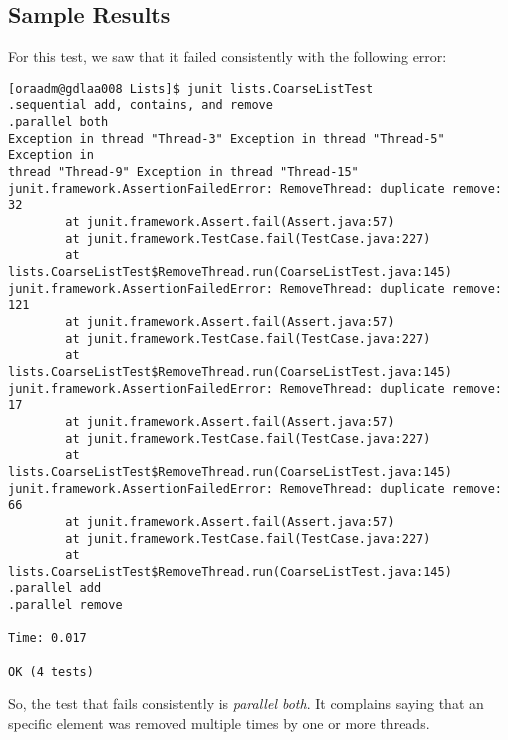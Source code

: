 \subsection{Sample Results}
\par
For this test, we saw that it failed consistently with the following error:
\begin{verbatim}
[oraadm@gdlaa008 Lists]$ junit lists.CoarseListTest
.sequential add, contains, and remove
.parallel both
Exception in thread "Thread-3" Exception in thread "Thread-5" Exception in
thread "Thread-9" Exception in thread "Thread-15"
junit.framework.AssertionFailedError: RemoveThread: duplicate remove: 32
        at junit.framework.Assert.fail(Assert.java:57)
        at junit.framework.TestCase.fail(TestCase.java:227)
        at lists.CoarseListTest$RemoveThread.run(CoarseListTest.java:145)
junit.framework.AssertionFailedError: RemoveThread: duplicate remove: 121
        at junit.framework.Assert.fail(Assert.java:57)
        at junit.framework.TestCase.fail(TestCase.java:227)
        at lists.CoarseListTest$RemoveThread.run(CoarseListTest.java:145)
junit.framework.AssertionFailedError: RemoveThread: duplicate remove: 17
        at junit.framework.Assert.fail(Assert.java:57)
        at junit.framework.TestCase.fail(TestCase.java:227)
        at lists.CoarseListTest$RemoveThread.run(CoarseListTest.java:145)
junit.framework.AssertionFailedError: RemoveThread: duplicate remove: 66
        at junit.framework.Assert.fail(Assert.java:57)
        at junit.framework.TestCase.fail(TestCase.java:227)
        at lists.CoarseListTest$RemoveThread.run(CoarseListTest.java:145)
.parallel add
.parallel remove

Time: 0.017

OK (4 tests)
\end{verbatim}
\par
So, the test that fails consistently is \textit{parallel both}. It complains
saying that an specific element was removed multiple times by one or more
threads.
\par
